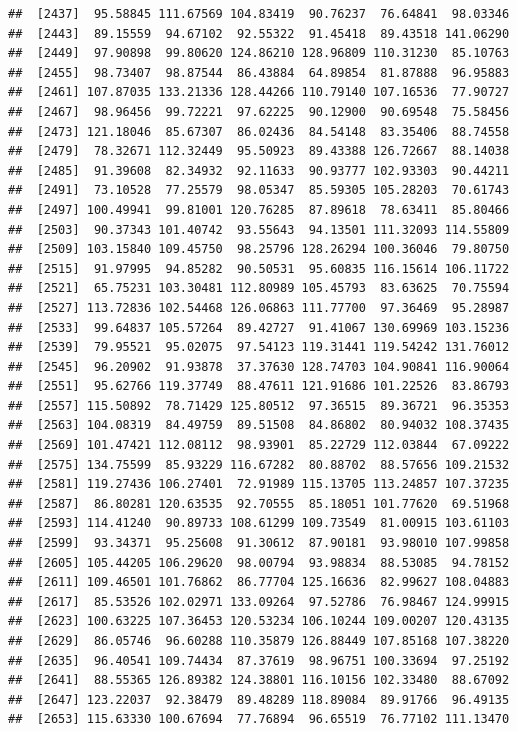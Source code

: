 \documentclass[
]{article}
\begin{document}
\begin{verbatim}
##  [2437]  95.58845 111.67569 104.83419  90.76237  76.64841  98.03346
##  [2443]  89.15559  94.67102  92.55322  91.45418  89.43518 141.06290
##  [2449]  97.90898  99.80620 124.86210 128.96809 110.31230  85.10763
##  [2455]  98.73407  98.87544  86.43884  64.89854  81.87888  96.95883
##  [2461] 107.87035 133.21336 128.44266 110.79140 107.16536  77.90727
##  [2467]  98.96456  99.72221  97.62225  90.12900  90.69548  75.58456
##  [2473] 121.18046  85.67307  86.02436  84.54148  83.35406  88.74558
##  [2479]  78.32671 112.32449  95.50923  89.43388 126.72667  88.14038
##  [2485]  91.39608  82.34932  92.11633  90.93777 102.93303  90.44211
##  [2491]  73.10528  77.25579  98.05347  85.59305 105.28203  70.61743
##  [2497] 100.49941  99.81001 120.76285  87.89618  78.63411  85.80466
##  [2503]  90.37343 101.40742  93.55643  94.13501 111.32093 114.55809
##  [2509] 103.15840 109.45750  98.25796 128.26294 100.36046  79.80750
##  [2515]  91.97995  94.85282  90.50531  95.60835 116.15614 106.11722
##  [2521]  65.75231 103.30481 112.80989 105.45793  83.63625  70.75594
##  [2527] 113.72836 102.54468 126.06863 111.77700  97.36469  95.28987
##  [2533]  99.64837 105.57264  89.42727  91.41067 130.69969 103.15236
##  [2539]  79.95521  95.02075  97.54123 119.31441 119.54242 131.76012
##  [2545]  96.20902  91.93878  37.37630 128.74703 104.90841 116.90064
##  [2551]  95.62766 119.37749  88.47611 121.91686 101.22526  83.86793
##  [2557] 115.50892  78.71429 125.80512  97.36515  89.36721  96.35353
##  [2563] 104.08319  84.49759  89.51508  84.86802  80.94032 108.37435
##  [2569] 101.47421 112.08112  98.93901  85.22729 112.03844  67.09222
##  [2575] 134.75599  85.93229 116.67282  80.88702  88.57656 109.21532
##  [2581] 119.27436 106.27401  72.91989 115.13705 113.24857 107.37235
##  [2587]  86.80281 120.63535  92.70555  85.18051 101.77620  69.51968
##  [2593] 114.41240  90.89733 108.61299 109.73549  81.00915 103.61103
##  [2599]  93.34371  95.25608  91.30612  87.90181  93.98010 107.99858
##  [2605] 105.44205 106.29620  98.00794  93.98834  88.53085  94.78152
##  [2611] 109.46501 101.76862  86.77704 125.16636  82.99627 108.04883
##  [2617]  85.53526 102.02971 133.09264  97.52786  76.98467 124.99915
##  [2623] 100.63225 107.36453 120.53234 106.10244 109.00207 120.43135
##  [2629]  86.05746  96.60288 110.35879 126.88449 107.85168 107.38220
##  [2635]  96.40541 109.74434  87.37619  98.96751 100.33694  97.25192
##  [2641]  88.55365 126.89382 124.38801 116.10156 102.33480  88.67092
##  [2647] 123.22037  92.38479  89.48289 118.89084  89.91766  96.49135
##  [2653] 115.63330 100.67694  77.76894  96.65519  76.77102 111.13470

\end{verbatim}
\end{document}
